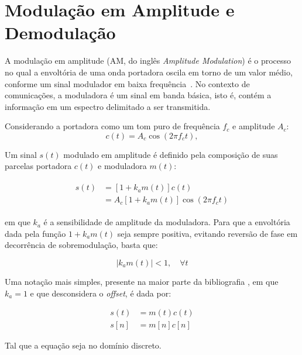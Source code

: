\section{Modulação em Amplitude e Demodulação}
A modulação em amplitude (AM, do inglês \textit{Amplitude Modulation}) é o
processo no qual a envoltória de uma onda portadora oscila em torno de um valor
médio, conforme um sinal modulador em baixa frequência~\cite{haykin2008}. No
contexto de comunicações, a moduladora é um sinal em  banda básica, isto é,
contém a informação em um espectro delimitado a ser transmitida.

Considerando a portadora como um tom puro de frequência $f_c$ e amplitude $A_c$:
\begin{equation}
    c(t) = A_c \cos(2\pi f_c t),
\end{equation}

    Um sinal $s(t)$ modulado em amplitude é definido pela composição de
suas parcelas portadora $c(t)$ e moduladora $m(t)$:

\begin{align}
\begin{split}
    s(t) & = [1+k_a m(t)]c(t) \\
    & = A_c[1+k_a m(t)]\cos(2\pi f_c t)
\end{split}
\end{align}

em que $k_a$ é a sensibilidade de amplitude da moduladora. Para que a envoltória
dada pela função $1+k_a m(t)$ seja sempre positiva, evitando reversão de fase
em decorrência de sobremodulação, basta que:

\begin{equation}
    |k_a m(t)| < 1, \quad \forall t
\end{equation}

Uma notação mais simples, presente na maior parte da 
bibliografia , em que $k_a = 1$ e que desconsidera o 
\textit{offset}, é dada por:

\begin{align}
    s(t) &= m(t)c(t) \\
    s[n] &= m[n]c[n] 
\end{align}

Tal que a equação seja no domínio discreto.

